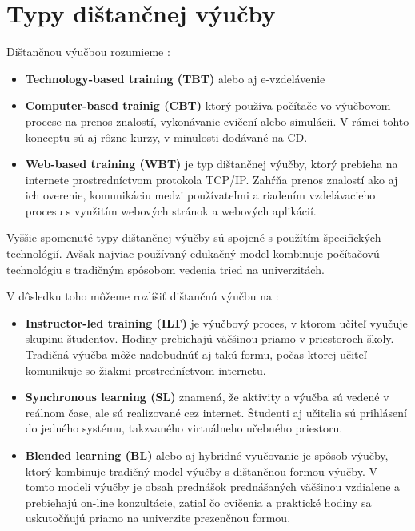 \documentclass[10pt,oneside,slovak,a4paper]{article}
\begin{document}
\section{Typy dištančnej výučby}
Dištančnou výučbou rozumieme \cite{WiktorzakKotowski}:
\begin{itemize}
	\item \textbf{Technology-based training (TBT)} alebo aj e-vzdelávenie
	\item \textbf{Computer-based trainig (CBT)} ktorý používa počítače vo výučbovom procese na prenos znalostí, vykonávanie cvičení alebo simulácii. V rámci tohto konceptu sú aj rôzne kurzy, v minulosti dodávané na CD.
	\item \textbf{Web-based training (WBT)} je typ dištančnej výučby, ktorý prebieha na internete prostredníctvom protokola TCP/IP. Zahŕňa prenos znalostí ako aj ich overenie, komunikáciu medzi používateľmi a riadením vzdelávacieho procesu s využitím webových stránok a webových aplikácií.
\end{itemize}
Vyššie spomenuté typy dištančnej výučby sú spojené s použítím špecifických technológií. 
Avšak najviac používaný edukačný model kombinuje počítačovú technológiu s tradičným spôsobom vedenia tried na univerzitách.

V dôsledku toho môžeme rozlíšiť dištančnú výučbu na :
\begin{itemize}
	\item \textbf{Instructor-led training (ILT)} je výučbový proces, v ktorom učiteľ vyučuje skupinu študentov. Hodiny prebiehajú väčšinou priamo v priestoroch školy. Tradičná výučba môže nadobudnúť aj takú formu, počas ktorej učiteľ komunikuje so žiakmi prostredníctvom internetu.
	\item \textbf{Synchronous learning (SL)} znamená, že aktivity a výučba sú vedené v reálnom čase, ale sú realizované cez internet. Študenti aj učitelia sú prihlásení do jedného systému, takzvaného virtuálneho učebného priestoru.
	\item \textbf{Blended learning (BL)} alebo aj hybridné vyučovanie je spôsob výučby, ktorý kombinuje tradičný model výučby s dištančnou formou výučby. V tomto modeli výučby je obsah prednášok prednášaných väčšinou vzdialene a prebiehajú on-line konzultácie, zatiaľ čo cvičenia a praktické hodiny sa uskutočňujú priamo na univerzite prezenčnou formou.
\end{itemize}
\end{document}
